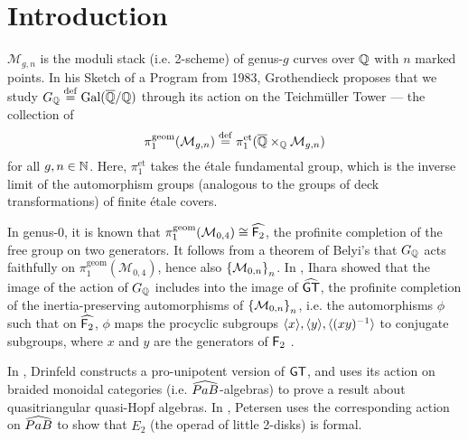 \chapter{Introduction}
$\mathcal{M}_{g,n}$ is the moduli stack (i.e. 2-scheme) of genus-$g$ curves over $\mathbb{Q}$ with $n$ marked points. In his Sketch of a Program \cite{Grothendieck_1997} from 1983, Grothendieck proposes that we study $G_{\mathbb{Q}}\overset{\mathrm{def}}{=}\mathrm{Gal}(\overline{\mathbb{Q}}/\mathbb{Q})$ through its action on the Teichm\"uller Tower --- the collection of
\[\pi^{\mathrm{geom}}_1(\mathcal{M}_{g,n})\overset{\mathrm{def}}{=}\pi_1^{\mathrm{et}}(\overline{\mathbb{Q}}\times_{\mathbb{Q}}\mathcal{M}_{g,n})\]
for all $g,n\in\mathbb{N}$. Here, $\pi_1^{\mathrm{et}}$ takes the \'etale fundamental group, which is the inverse limit of the automorphism groups (analogous to the groups of deck transformations) of finite \'etale covers.

In genus-0, it is known that $\pi^{\mathrm{geom}}_1(\mathcal{M}_{0,4})\cong\widehat{\mathsf{F}_2}$, the profinite completion of the free group on two generators. It follows from a theorem of Belyi's \cite{Belyĭ_1980} that $G_{\mathbb{Q}}$ acts faithfully on $\pi^{\mathrm{geom}}_1(\mathcal{M}_{0,4})$, hence also $\left\{\mathcal{M}_{0,n}\right\}_n$. In \cite{Ihara_1991}, Ihara showed that the image of the action of $G_{\mathbb{Q}}$ includes into the image of $\widehat{\mathsf{GT}}$, the profinite completion of the inertia-preserving automorphisms of $\left\{\mathcal{M}_{0,n}\right\}_n$, i.e. the automorphisms $\phi$ such that on $\widehat{\mathsf{F}_2}$, $\phi$ maps the procyclic subgroups $\langle x\rangle,\langle y\rangle,\langle(xy)^{-1}\rangle$ to conjugate subgroups, where $x$ and $y$ are the generators of $\mathsf{F}_2$ \cite{Lochak}.

In \cite{Drinfeld_1991}, Drinfeld constructs a pro-unipotent
version of $\mathsf{GT}$, and uses its action on braided monoidal categories (i.e. $\widehat{\mathnormal{PaB}}$-algebras) to prove a result about quasitriangular quasi-Hopf algebras.
In \cite{Petersen_2014}, Petersen uses the corresponding action on $\widehat{\mathnormal{PaB}}$ to show that $E_2$ (the operad of little 2-disks) is formal.